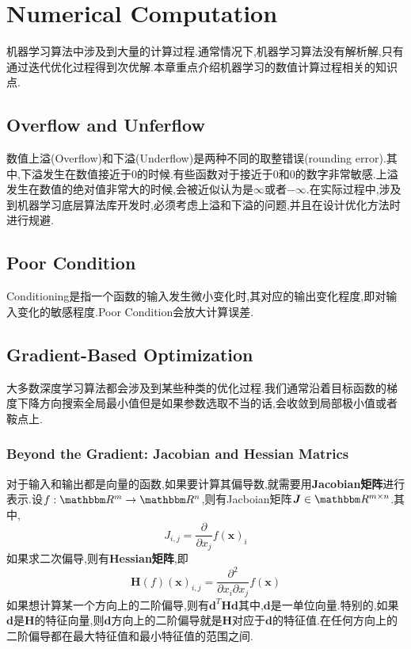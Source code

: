 \chapter{Numerical Computation}

机器学习算法中涉及到大量的计算过程.通常情况下,机器学习算法没有解析解,只有通过迭代优化过程得到次优解.本章重点介绍机器学习的数值计算过程相关的知识点.

\section{Overflow and Unferflow}
数值上溢(Overflow)和下溢(Underflow)是两种不同的取整错误(rounding error).其中,下溢发生在数值接近于$0$的时候.有些函数对于接近于$0$和$0$的数字非常敏感.上溢发生在数值的绝对值非常大的时候,会被近似认为是$\infty$或者$-\infty$.在实际过程中,涉及到机器学习底层算法库开发时,必须考虑上溢和下溢的问题,并且在设计优化方法时进行规避.

\section{Poor Condition}
Conditioning是指一个函数的输入发生微小变化时,其对应的输出变化程度,即对输入变化的敏感程度.Poor Condition会放大计算误差.

\section{Gradient-Based Optimization}
大多数深度学习算法都会涉及到某些种类的优化过程.我们通常沿着目标函数的梯度下降方向搜索全局最小值但是如果参数选取不当的话,会收敛到局部极小值或者鞍点上.

\subsection{Beyond the Gradient: Jacobian and Hessian Matrics}
对于输入和输出都是向量的函数,如果要计算其偏导数,就需要用\textbf{Jacobian矩阵}进行表示.设$f:\mathbbm R^m\rightarrow\mathbbm R^n$,则有Jacboian矩阵$\bm J\in\mathbbm R^{m\times n}$.其中,
\begin{equation}\label{eq:jacobian_matrix}
J_{i,j}=\frac{\partial}{\partial x_j}f(\bm x)_i
\end{equation}
如果求二次偏导,则有\textbf{Hessian矩阵},即
\begin{equation}\label{eq:hessian_matrix}
\bm H(f)(\bm x)_{i,j}=\frac{\partial^2}{\partial x_i\partial x_j}f(\bm x)
\end{equation}
如果想计算某一个方向上的二阶偏导,则有$\bm{d}^T\bm{Hd}$其中,$\bm d$是一单位向量.特别的,如果$\bm d$是$\bm H$的特征向量,则$\bm d$方向上的二阶偏导就是$\bm H$对应于$\bm d$的特征值.在任何方向上的二阶偏导都在最大特征值和最小特征值的范围之间.

